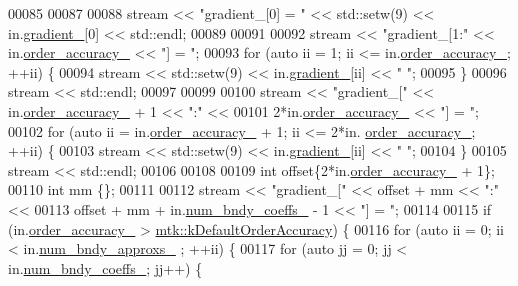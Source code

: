 \begin{DoxyCode}
00085 
00087 
00088   stream << \textcolor{stringliteral}{"gradient\_[0] = "} << std::setw(9) << in.\hyperlink{classmtk_1_1Grad1D_a024b84b1ea285c0c590eb42d40ff4469}{gradient\_}[0] << std::endl;
00089 
00091 
00092   stream << \textcolor{stringliteral}{"gradient\_[1:"} << in.\hyperlink{classmtk_1_1Grad1D_a545e9c865e5d4716f2684a64f744c78c}{order\_accuracy\_} << \textcolor{stringliteral}{"] = "};
00093   \textcolor{keywordflow}{for} (\textcolor{keyword}{auto} ii = 1; ii <= in.\hyperlink{classmtk_1_1Grad1D_a545e9c865e5d4716f2684a64f744c78c}{order\_accuracy\_}; ++ii) \{
00094     stream << std::setw(9) << in.\hyperlink{classmtk_1_1Grad1D_a024b84b1ea285c0c590eb42d40ff4469}{gradient\_}[ii] << \textcolor{stringliteral}{" "};
00095   \}
00096   stream << std::endl;
00097 
00099 
00100   stream << \textcolor{stringliteral}{"gradient\_["} << in.\hyperlink{classmtk_1_1Grad1D_a545e9c865e5d4716f2684a64f744c78c}{order\_accuracy\_} + 1 << \textcolor{stringliteral}{":"} <<
00101     2*in.\hyperlink{classmtk_1_1Grad1D_a545e9c865e5d4716f2684a64f744c78c}{order\_accuracy\_} << \textcolor{stringliteral}{"] = "};
00102   \textcolor{keywordflow}{for} (\textcolor{keyword}{auto} ii = in.\hyperlink{classmtk_1_1Grad1D_a545e9c865e5d4716f2684a64f744c78c}{order\_accuracy\_} + 1; ii <= 2*in.
      \hyperlink{classmtk_1_1Grad1D_a545e9c865e5d4716f2684a64f744c78c}{order\_accuracy\_}; ++ii) \{
00103     stream << std::setw(9) << in.\hyperlink{classmtk_1_1Grad1D_a024b84b1ea285c0c590eb42d40ff4469}{gradient\_}[ii] << \textcolor{stringliteral}{" "};
00104   \}
00105   stream << std::endl;
00106 
00108 
00109   \textcolor{keywordtype}{int} offset\{2*in.\hyperlink{classmtk_1_1Grad1D_a545e9c865e5d4716f2684a64f744c78c}{order\_accuracy\_} + 1\};
00110   \textcolor{keywordtype}{int} mm \{\};
00111 
00112   stream << \textcolor{stringliteral}{"gradient\_["} << offset + mm << \textcolor{stringliteral}{":"} <<
00113     offset + mm + in.\hyperlink{classmtk_1_1Grad1D_a60c560882bc601f9ab1d4cd5331e55ef}{num\_bndy\_coeffs\_} - 1 << \textcolor{stringliteral}{"] = "};
00114 
00115   \textcolor{keywordflow}{if} (in.\hyperlink{classmtk_1_1Grad1D_a545e9c865e5d4716f2684a64f744c78c}{order\_accuracy\_} > \hyperlink{group__c01-roots_ga0d95560098eb36420511103637b6952f}{mtk::kDefaultOrderAccuracy}) \{
00116     \textcolor{keywordflow}{for} (\textcolor{keyword}{auto} ii = 0; ii < in.\hyperlink{classmtk_1_1Grad1D_abe15c1ffd9dfaba1a65f4f0e096287ce}{num\_bndy\_approxs\_} ; ++ii) \{
00117       \textcolor{keywordflow}{for} (\textcolor{keyword}{auto} jj = 0; jj < in.\hyperlink{classmtk_1_1Grad1D_a60c560882bc601f9ab1d4cd5331e55ef}{num\_bndy\_coeffs\_}; jj++) \{

\end{DoxyCode}
